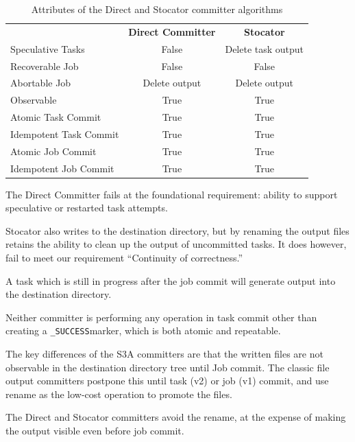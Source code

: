\documentclass[conference]{IEEEtran}
\newcommand{\SUCCESS}{\texttt{\_SUCCESS}}
\begin{document}
\begin{table}
  \label{tab:other-committer-attributes}
  \begin{tabular}{ l c c }
    \hline
    & \textbf{Direct Committer} & \textbf{Stocator} \\
    Speculative Tasks & False & Delete task output \\
    Recoverable Job & False & False \\
    Abortable Job & Delete output & Delete output \\
    Observable & True & True \\
    Atomic Task Commit & True & True \\
    Idempotent Task Commit & True & True \\
    Atomic Job Commit & True & True \\
    Idempotent Job Commit & True & True \\
    \hline
  \end{tabular}
  \caption{Attributes of the Direct and Stocator committer algorithms}
\end{table}


The Direct Committer fails at the foundational requirement: ability to support
speculative or restarted task attempts.

Stocator also writes to the destination directory, but by renaming the output
files retains the ability to clean up the output of uncommitted tasks.
It does however, fail to meet our requirement ``Continuity of correctness.''

A task which is still in progress after the job commit will generate output
into the destination directory.


Neither committer is performing any operation in task commit other than creating
a \SUCCESS marker, which is both atomic and repeatable.


The key differences of the S3A committers are that the written files are
not observable in the destination directory tree until Job commit.
The classic file output committers postpone this until task (v2) or job (v1)
commit, and use rename as the low-cost operation to promote the files.


The Direct and Stocator committers avoid the rename, at the expense of making
the output visible even before job commit.
\end{document}
